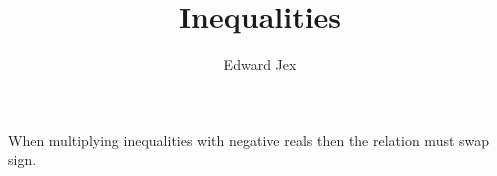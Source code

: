 \documentclass[a4paper,12pt]{article}
\begin{document}
\title{Inequalities}	
\author{Edward Jex}
\maketitle
\newcommand\warningsign{\symbol{"26A0}}
When multiplying inequalities with negative reals then the relation must swap sign. 
\end{document}
